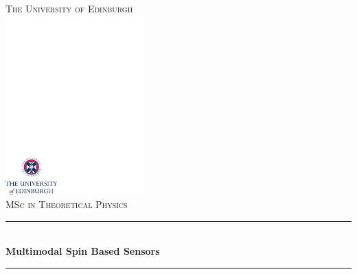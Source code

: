 \begin{titlepage}

\newcommand{\HRule}{\rule{\linewidth}{0.5mm}} %

\center %
 

\textsc{\LARGE The University of Edinburgh}\\[1.5cm] %
\includegraphics[width=0.4\textwidth]{../crest.pdf}\\[1cm] %
\textsc{\Large MSc in Theoretical Physics}\\[0.5cm] %


\HRule \\[0.4cm]
{ \Huge \bfseries\rmfamily Multimodal Spin Based Sensors}\\[0.4cm] %
\HRule \\[1.5cm]
 


\end{titlepage}

